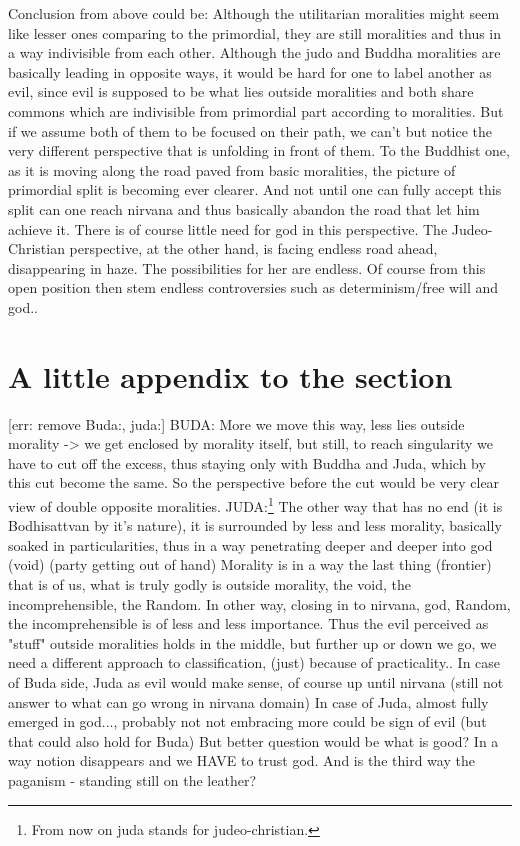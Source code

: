 \documentclass[10pt]{book}
\begin{document}
Conclusion from above could be: Although the utilitarian moralities might seem like lesser ones comparing to the primordial, they are still moralities and thus in a way indivisible from each other. Although the judo and Buddha moralities are basically leading in opposite ways, it would be hard for one to label another as evil, since evil is supposed to be what lies outside moralities and both share commons which are indivisible from primordial part according to moralities. 
But if we assume both of them to be focused on their path, we can't but notice the very different perspective that is unfolding in front of them. To the Buddhist one, as it is moving along the road paved from basic moralities, the picture of primordial split is becoming ever clearer. And not until one can fully accept this split can one reach nirvana and thus basically abandon the road that let him achieve it. There is of course little need for god in this perspective.
The Judeo-Christian perspective, at the other hand, is facing endless road ahead, disappearing in haze. The possibilities for her are endless. Of course from this open position then stem endless controversies such as determinism/free will and god..  

\section{A little appendix to the section}

[err: remove Buda:, juda:]
BUDA: More we move this way, less lies outside morality -> we get enclosed by morality itself, but still, to reach singularity we have to cut off the excess, thus staying only with Buddha and Juda, which by this cut become the same. So the perspective before the cut would be very clear view of double opposite moralities.
JUDA:\footnote{From now on juda stands for judeo-christian.} The other way that has no end (it is Bodhisattvan by it's nature), it is surrounded by less and less morality, basically soaked in particularities, thus in a way penetrating deeper and deeper into god (void) (party getting out of hand)
Morality is in a way the last thing (frontier) that is of us, what is truly godly is outside morality, the void, the incomprehensible, the Random. In other way, closing in to nirvana, god, Random, the incomprehensible is of less and less importance. 
Thus the evil perceived as "stuff" outside moralities holds in the middle, but further up or down we go, we need a different approach to classification, (just) because of practicality.. In case of Buda side, Juda as evil would make sense, of course up until nirvana (still not answer to what can go wrong in nirvana domain) In case of Juda, almost fully emerged in god..., probably not not embracing more could be sign of evil (but that could also hold for Buda) But better question would be what is good? In a way notion disappears and we HAVE to trust god.
And is the third way the paganism - standing still on the leather?
\end{document}
